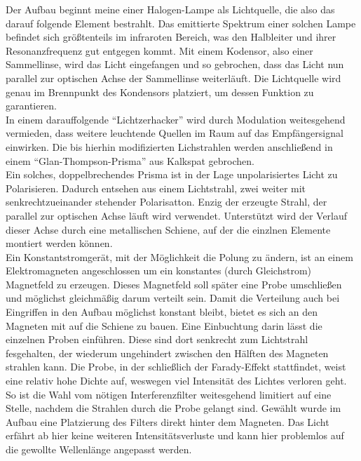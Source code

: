 Der Aufbau beginnt meine einer Halogen-Lampe als Lichtquelle, die also das darauf folgende Element bestrahlt. Das 
emittierte Spektrum einer solchen Lampe befindet sich größtenteils im infraroten Bereich, was den Halbleiter und ihrer 
Resonanzfrequenz gut entgegen kommt. Mit einem Kodensor, also einer Sammellinse, wird das Licht eingefangen und so gebrochen, 
dass das Licht nun parallel zur optischen Achse der Sammellinse weiterläuft. 
Die Lichtquelle wird genau im Brennpunkt des Kondensors platziert, um dessen Funktion zu garantieren.
\\
\newline
In einem darauffolgende \enquote{Lichtzerhacker} wird durch Modulation weitesgehend vermieden, dass weitere leuchtende Quellen im Raum
auf das Empfängersignal einwirken. Die bis hierhin modifizierten Lichstrahlen werden anschließend in einem
\enquote{Glan-Thompson-Prisma} aus Kalkspat gebrochen. \\
Ein solches, doppelbrechendes Prisma ist in der Lage unpolarisiertes Licht zu Polarisieren. Dadurch entsehen 
aus einem Lichtstrahl, zwei weiter mit senkrechtzueinander stehender Polarisatton. Enzig der erzeugte Strahl, 
der parallel zur optischen Achse läuft wird verwendet. Unterstützt wird der Verlauf dieser Achse durch eine metallischen Schiene,
auf der die einzlnen Elemente montiert werden können.
\\
\newline
Ein Konstantstromgerät, mit der Möglichkeit die Polung zu ändern, ist an einem Elektromagneten angeschlossen um ein konstantes (durch Gleichstrom) Magnetfeld
zu erzeugen. Dieses Magnetfeld soll später eine Probe umschließen und möglichst gleichmäßig darum verteilt sein. Damit die Verteilung 
auch bei Eingriffen in den Aufbau möglichst konstant bleibt, bietet es sich an den Magneten mit auf die Schiene zu bauen. Eine Einbuchtung 
darin lässt die einzelnen Proben einführen. Diese sind dort senkrecht zum Lichtstrahl fesgehalten, der wiederum ungehindert zwischen den Hälften des Magneten 
strahlen kann. Die Probe, in der schließlich der Farady-Effekt stattfindet, weist eine relativ hohe Dichte auf, weswegen viel Intensität des Lichtes verloren geht. 
So ist die Wahl vom nötigen Interferenzfilter weitesgehend limitiert auf eine Stelle, nachdem die Strahlen durch die Probe gelangt sind. 
Gewählt wurde im Aufbau eine Platzierung des Filters direkt hinter dem Magneten. Das Licht erfährt ab hier keine weiteren Intensitätsverluste und kann hier problemlos
auf die gewollte Wellenlänge angepasst werden.
\\
